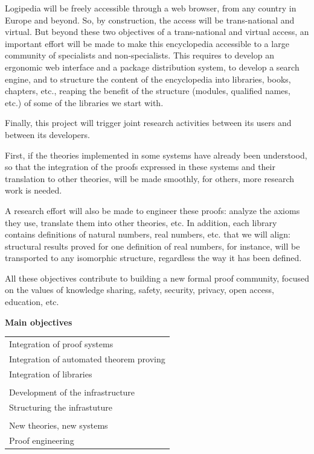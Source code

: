 Logipedia will be freely accessible through a web browser, from any
country in Europe and beyond. So, by construction, the access will be
trans-national and virtual. But beyond these two objectives of a
trans-national and virtual access, an important effort will be made to
make this encyclopedia accessible to a large community of specialists
and non-specialists. This requires to develop an ergonomic web
interface and a package distribution system, to develop a search
engine, and to structure the content of the encyclopedia into
libraries, books, chapters, etc., reaping the benefit of the structure
(modules, qualified names, etc.) of some of the libraries we start
with.

Finally, this project will trigger joint research activities between
its users and between its developers.  

First, if the theories implemented in some systems have already been
understood, so that the integration of the proofs expressed in these
systems and their translation to other theories, will be made
smoothly, for others, more research work is needed. 

A research effort will also be made to engineer these proofs: analyze
the axioms they use, translate them into other theories, etc.  In
addition, each library contains definitions of natural numbers, real
numbers, etc. that we will align: structural results proved for one
definition of real numbers, for instance, will be transported to any
isomorphic structure, regardless the way it has been defined.

All these objectives contribute to building a new formal proof
community, focused on the values of
knowledge sharing, safety, security, privacy, open access, education, etc.

\newpage

\begin{framed}
\begin{center}
{\bf Main objectives}
\end{center}

\begin{tabular}{l}
  Integration of proof systems\\
  Integration of automated theorem proving\\
  Integration of libraries\\
  \\
  Development of the infrastructure\\
  Structuring the infrastuture\\
  \\
  New theories, new systems\\
  Proof engineering\\
\end{tabular}
\end{framed}


